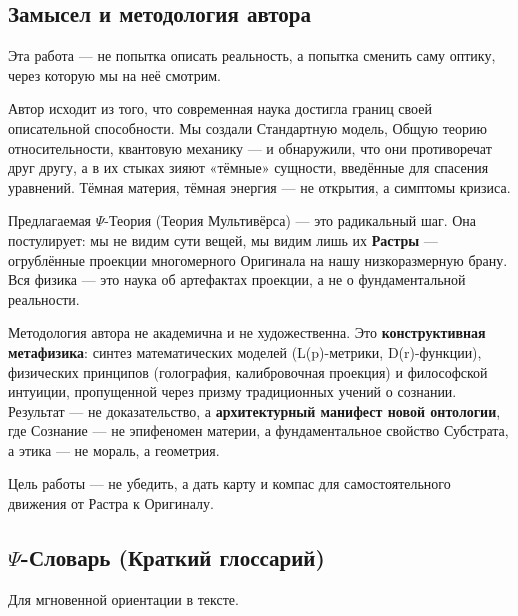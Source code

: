 \documentclass[a4paper,12pt]{article}
\begin{document}
\subsection{Замысел и методология автора}

Эта работа — не попытка описать реальность, а попытка сменить саму оптику, через которую мы на неё смотрим.

Автор исходит из того, что современная наука достигла границ своей описательной способности. Мы создали Стандартную модель, Общую теорию относительности, квантовую механику — и обнаружили, что они противоречат друг другу, а в их стыках зияют «тёмные» сущности, введённые для спасения уравнений. Тёмная материя, тёмная энергия — не открытия, а симптомы кризиса.

Предлагаемая $\Psi$-Теория (Теория Мультивёрса) — это радикальный шаг. Она постулирует: мы не видим сути вещей, мы видим лишь их \textbf{Растры} — огрублённые проекции многомерного Оригинала на нашу низкоразмерную брану. Вся физика — это наука об артефактах проекции, а не о фундаментальной реальности.

Методология автора не академична и не художественна. Это \textbf{конструктивная метафизика}: синтез математических моделей (L(p)-метрики, D(r)-функции), физических принципов (голография, калибровочная проекция) и философской интуиции, пропущенной через призму традиционных учений о сознании. Результат — не доказательство, а \textbf{архитектурный манифест новой онтологии}, где Сознание — не эпифеномен материи, а фундаментальное свойство Субстрата, а этика — не мораль, а геометрия.

Цель работы — не убедить, а дать карту и компас для самостоятельного движения от Растра к Оригиналу.

\subsection{$\Psi$-Словарь (Краткий глоссарий)}

Для мгновенной ориентации в тексте.
\end{document}
